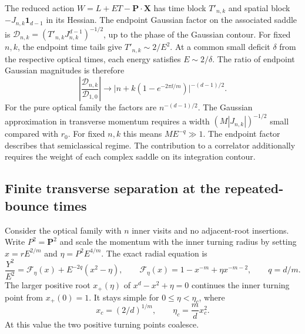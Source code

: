 The reduced action \(W=L+ET-\boldsymbol P\cdot\boldsymbol X\)
has time block \(T'_{n,k}\) and spatial block
\(-J_{n,k}\mathbf 1_{d-1}\) in its Hessian.
The endpoint Gaussian factor on the associated saddle is
\(\mathcal D_{n,k}=(T'_{n,k}J_{n,k}^{d-1})^{-1/2}\), up to
the phase of the Gaussian contour. For fixed \(n,k\),
the endpoint time tails give \(T'_{n,k}\sim 2/E^2\).
At a common small deficit \(\delta\) from the respective optical
times, each energy satisfies \(E\sim2/\delta\).
The ratio of endpoint Gaussian magnitudes is therefore
\begin{equation}
 \left|\frac{\mathcal D_{n,k}}{\mathcal D_{1,0}}\right|
 \longrightarrow
 \big|n+k(1-e^{-2\pi\ii/m})\big|^{-(d-1)/2}.
 \label{eq:jacobi-ratio}
\end{equation}
For the pure optical family the factors are \(n^{-(d-1)/2}\).
The Gaussian approximation in transverse momentum requires a
width \((M|J_{n,k}|)^{-1/2}\) small compared with \(r_0\).
For fixed \(n,k\) this means \(ME^{-q}\gg1\). The endpoint factor
describes that semiclassical regime. The contribution to a
correlator additionally requires the weight of each complex
saddle on its integration contour.

\subsection{Finite transverse separation at the repeated-bounce times}
\label{sec:einstein-transverse-geodesic}

Consider the optical family with \(n\) inner visits and no
adjacent-root insertions. Write \(P^2=\boldsymbol P^2\) and scale
the momentum with the inner turning radius by setting
\(x=rE^{2/m}\) and \(\eta=P^2 E^{4/m}\). The exact radial equation is
\begin{equation}
 \frac{Y^2}{E^2}=\mathcal F_\eta(x)+E^{-2q}(x^2-\eta),
 \qquad \mathcal F_\eta(x)=1-x^{-m}+\eta x^{-m-2},
 \qquad q=d/m .
 \label{eq:einstein-transverse-core}
\end{equation}
The larger positive root \(x_+(\eta)\) of \(x^d-x^2+\eta=0\)
continues the inner turning point from \(x_+(0)=1\).
It stays simple for \(0\leq\eta<\eta_c\), where
\begin{equation}
 x_c=(2/d)^{1/m},\qquad \eta_c=\frac{m}{d}x_c^2 .
\end{equation}
At this value the two positive turning points coalesce.

